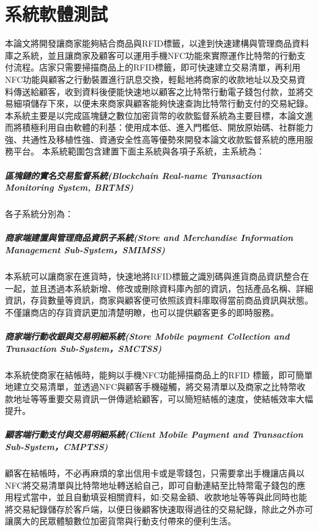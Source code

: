 \chapter{系統軟體測試}

本論文將開發讓商家能夠結合商品與RFID標籤，以達到快速建構與管理商品資料庫之系統，並且讓商家及顧客可以運用手機NFC功能來實際運作比特幣的行動支付流程。店家只需要掃描商品上的RFID標籤，即可快速建立交易清單，再利用NFC功能與顧客之行動裝置進行訊息交換，輕鬆地將商家的收款地址以及交易資料傳送給顧客，收到資料後便能快速地以顧客之比特幣行動電子錢包付款，並將交易細項儲存下來，以便未來商家與顧客能夠快速查詢比特幣行動支付的交易紀錄。
本系統主要是以完成區塊鏈之數位加密貨幣的收款監督系統為主要目標，本論文進而將積極利用自由軟體的利基：使用成本低、進入門檻低、開放原始碼、社群能力強、共通性及移植性強、資通安全性高等優勢來開發本論文收款監督系統的應用服務平台。
本系統範圍包含建置下面主系統與各項子系統，主系統為：
		\paragraph{區塊鏈的實名交易監督系統(Blockchain Real-name Transaction Monitoring System, BRTMS)}

各子系統分別為：
 		\paragraph{商家端建置與管理商品資訊子系統(Store and Merchandise Information Management Sub-System，SMIMSS)}本系統可以讓商家在進貨時，快速地將RFID標籤之識別碼與進貨商品資訊整合在一起，並且透過本系統新增、修改或刪除資料庫內部的資訊，包括產品名稱、詳細資訊，存貨數量等資訊，商家與顧客便可依照該資料庫取得當前商品資訊與狀態。不僅讓商店的存貨資訊更加清楚明瞭，也可以提供顧客更多的即時服務。
 		\paragraph{商家端行動收銀與交易明細系統(Store Mobile payment Collection and Transaction Sub-System，SMCTSS)}本系統使商家在結帳時，能夠以手機NFC功能掃描商品上的RFID 標籤，即可簡單地建立交易清單，並透過NFC與顧客手機碰觸，將交易清單以及商家之比特幣收款地址等等重要交易資訊一併傳遞給顧客，可以簡短結帳的速度，使結帳效率大幅提升。 
 		\paragraph{顧客端行動支付與交易明細系統(Client Mobile Payment and Transaction Sub-System，CMPTSS)}顧客在結帳時，不必再麻煩的拿出信用卡或是零錢包，只需要拿出手機讓店員以NFC將交易清單與比特幣地址轉送給自己，即可自動連結至比特幣電子錢包的應用程式當中，並且自動填妥相關資料，如:交易金額、收款地址等等與此同時也能將交易紀錄儲存於客戶端，以便日後顧客快速取得過往的交易紀錄，除此之外亦可讓廣大的民眾體驗數位加密貨幣與行動支付帶來的便利生活。

